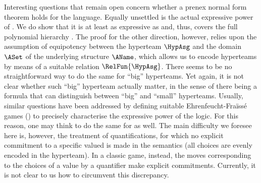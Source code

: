 \documentclass[authoryear]{elsarticle}
\begin{document}
Interesting questions that remain open concern whether a prenex normal form
theorem holds for the language.
Equally unsettled is the actual expressive power of \ADIF.
We do show that it is at least as expressive as \SOL and, thus, covers the full
polynomial hierarchy \PH.
The proof for the other direction, however, relies upon the assumption of
equipotency between the hyperteam $\HypAsg$ and the domain $\ASet$ of the
underlying structure $\AName$, which allows us to encode hyperteams by means of
a suitable relation $\RelFun{\HypAsg}$.
There seems to be no straightforward way to do the same for ``big'' hyperteams.
Yet again, it is not clear whether such ``big'' hyperteam actually matter, in
the sense of there being a formula that can distinguish between ``big'' and
``small'' hyperteams.
Usually, similar questions have been addressed by defining suitable
Ehrenfeucht-Fra\"iss\'e games (\EFG) to precisely characterise the expressive
power of the logic.
For this reason, one may think to do the same for \ADIF as well.
The main difficulty we foresee here is, however, the treatment of
quantifications, for which no explicit commitment to a specific valued is made
in the semantics (all choices are evenly encoded in the hyperteam).
In a classic \EFG game, instead, the moves corresponding to the choices of a
value by a quantifier make explicit commitments.
Currently, it is not clear to us how to circumvent this discrepancy.








\end{document}
